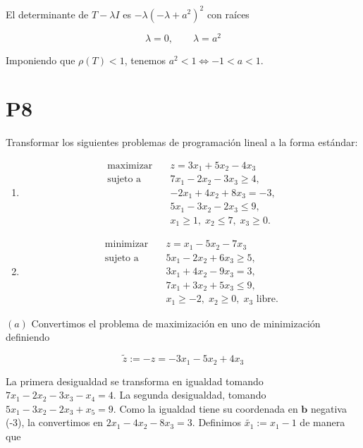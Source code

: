 \documentclass[12pt]{article}
\begin{document}
El determinante de $T - \lambda I$ es $-\lambda\left(-\lambda+a^2\right)^2$ con
raíces 

\begin{equation*}
    \lambda = 0, \qquad \lambda = a^2
\end{equation*}

Imponiendo que $\rho(T) < 1$, tenemos $a^2 < 1 \iff -1 < a < 1$.

\pagebreak 

\section{P8}


\begin{myframe}
    \item Transformar los siguientes problemas de programación lineal a la forma estándar:

\begin{enumerate}
\item[(a)]
\[
\begin{aligned}
\text{maximizar} \quad & z = 3x_1 + 5x_2 - 4x_3 \\
\text{sujeto a} \quad
& 7x_1 - 2x_2 - 3x_3 \geq 4, \\
& -2x_1 + 4x_2 + 8x_3 = -3, \\
& 5x_1 - 3x_2 - 2x_3 \leq 9, \\
& x_1 \geq 1,\; x_2 \leq 7,\; x_3 \geq 0.
\end{aligned}
\]

\item[(b)]
\[
\begin{aligned}
\text{minimizar} \quad & z = x_1 - 5x_2 - 7x_3 \\
\text{sujeto a} \quad
& 5x_1 - 2x_2 + 6x_3 \geq 5, \\
& 3x_1 + 4x_2 - 9x_3 = 3, \\
& 7x_1 + 3x_2 + 5x_3 \leq 9, \\
& x_1 \geq -2,\; x_2 \geq 0,\; x_3 \text{ libre}.
\end{aligned}
\]
\end{enumerate}
\end{myframe}

$(a)$ Convertimos el problema de maximización en uno de minimización definiendo 

\begin{equation*}
    \widetilde{ z } := -z = -3x_1 - 5x_2 + 4x_3
\end{equation*}


La primera desigualdad se transforma en igualdad tomando $7x_1 -2x_2 -3x_3 - x_4
= 4$. La segunda desigualdad, tomando $5x_1 -3x_2 -2x_3 + x_5 = 9$. Como la
igualdad tiene su coordenada en $\textbf{b}$ negativa (-3), la convertimos en 
$2x_1 - 4x_2 - 8x_3 = 3$. Definimos $\widetilde{ x_1 } := x_1 - 1$ de manera que
\end{document}
